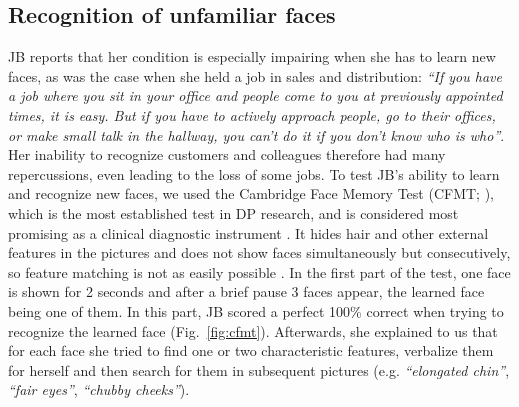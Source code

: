 \documentclass[fleqn,10pt]{SelfArx} %
\begin{document}
\subsection*{Recognition of unfamiliar faces}

JB reports that her condition is especially impairing when she has to learn new faces, as was the case when she held a job in sales and distribution: \textit{“If you have a job where you sit in your office and people come to you at previously appointed times, it is easy. But if you have to actively approach people, go to their offices, or make small talk in the hallway, you can't do it if you don't know who is who”}. Her inability to recognize customers and colleagues therefore had many repercussions, even leading to the loss of some jobs.
To test JB's ability to learn and recognize new faces, we used the Cambridge Face Memory Test (CFMT; \citet{Duchaine_2006cfmt}), which is the most established test in DP research, and is considered most promising as a clinical diagnostic instrument \citep{Susilo_2013, Towler_2017}. It hides hair and other external features in the pictures and does not show faces simultaneously but consecutively, so feature matching is not as easily possible \citep{Duchaine_2006cfmt}. In the first part of the test, one face is shown for 2 seconds and after a brief pause 3 faces appear, the learned face being one of them. In this part, JB scored a perfect 100\% correct when trying to recognize the learned face (Fig.~\ref{fig:cfmt}). Afterwards, she explained to us that for each face she tried to find one or two characteristic features, verbalize them for herself and then search for them in subsequent pictures (e.g. \textit{“elongated chin”}, \textit{“fair eyes”}, \textit{“chubby cheeks”}).
\end{document}

